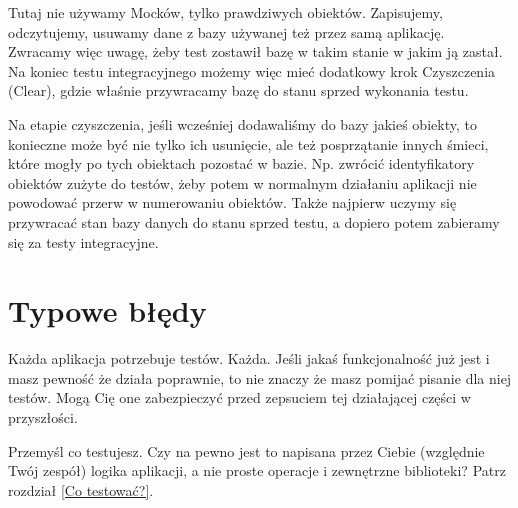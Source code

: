 \documentclass[10pt]{article}
\begin{document}
Tutaj nie używamy Mocków, tylko prawdziwych obiektów. Zapisujemy, odczytujemy, usuwamy dane z bazy używanej też przez samą aplikację. Zwracamy więc uwagę, żeby test zostawił bazę w takim stanie w jakim ją zastał. Na koniec testu integracyjnego możemy więc mieć dodatkowy krok Czyszczenia (Clear), gdzie właśnie przywracamy bazę do stanu sprzed wykonania testu.

Na etapie czyszczenia, jeśli wcześniej dodawaliśmy do bazy jakieś obiekty, to konieczne może być nie tylko ich usunięcie, ale też posprzątanie innych śmieci, które mogły po tych obiektach pozostać w bazie. Np. zwrócić identyfikatory obiektów zużyte do testów, żeby potem w normalnym działaniu aplikacji nie powodować przerw w numerowaniu obiektów. Także najpierw uczymy się przywracać stan bazy danych do stanu sprzed testu, a dopiero potem zabieramy się za testy integracyjne.

\section{Typowe błędy}
Każda aplikacja potrzebuje testów. Każda. Jeśli jakaś funkcjonalność już jest i masz pewność że działa poprawnie, to nie znaczy że masz pomijać pisanie dla niej testów. Mogą Cię one zabezpieczyć przed zepsuciem tej działającej części w przyszłości.

Przemyśl co testujesz. Czy na pewno jest to napisana przez Ciebie (względnie Twój zespół) logika aplikacji, a nie proste operacje i zewnętrzne biblioteki? Patrz rozdział \ref{Co testować?}.
\end{document}
